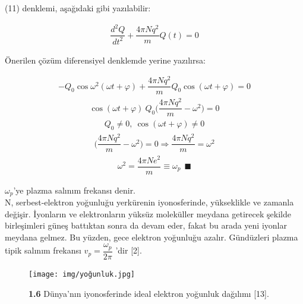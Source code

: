 \documentclass[a4paper,11pt]{article}
\begin{document}
(11) denklemi, aşağıdaki gibi yazılabilir:

\begin{align*}
\dfrac{d^{2}Q}{dt^{2}} + \dfrac{4 \pi N q^{2}}{m} Q (t)  = 0
\end{align*}

Önerilen çözüm diferensiyel denklemde yerine yazılırsa:

\begin{align}
 - Q_{0} \cos \omega^{2} (\omega t + \varphi) +  \dfrac{4 \pi N q^{2}}{m}  Q_{0} \cos (\omega t + \varphi) = 0
\end{align}
\begin{align}
\cos (\omega t + \varphi) \  Q_{0} \bigg(\dfrac{4 \pi N q^{2}}{m} - \omega^{2}\bigg)  = 0
\end{align}
\begin{align}
 Q_{0} \neq 0,  \ \cos (\omega t + \varphi) \neq 0
\end{align}
\begin{align}
\bigg(\dfrac{4 \pi N q^{2}}{m} - \omega^{2}\bigg) = 0 \Rightarrow \dfrac{4 \pi N q^{2}}{m}  =  \omega^{2}
\end{align}
\begin{align}
\omega^{2} = \dfrac{4 \pi N e^{2}}{m} \equiv \omega_{p} 
\ 
\ \blacksquare
\end{align}


$ \omega_{p}  $'ye plazma salınım frekansı denir.  \\


N, serbest-elektron yoğunluğu yerkürenin iyonosferinde, yükseklikle ve zamanla değişir. İyonların ve elektronların yüksüz moleküller meydana getirecek şekilde birleşimleri güneş battıktan sonra da devam eder, fakat bu arada yeni iyonlar meydana gelmez. Bu yüzden, gece elektron yoğunluğu azalır. Gündüzleri plazma tipik salınım frekansı $ v_{p} = \dfrac{\omega_{p}}{2 \pi} $ 'dir  [2].

\begin{figure}[h]
	\centering
	\texttt{[image: img/yoğunluk.jpg]}
	\caption* {\textbf{1.6} Dünya'nın iyonosferinde ideal elektron yoğunluk dağılımı [13].}
\end{figure}

\newpage
\end{document}
